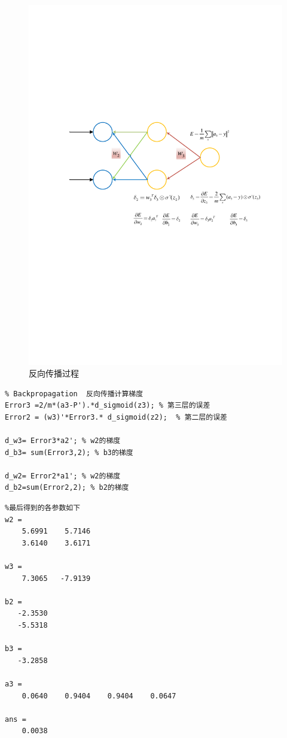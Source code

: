 \begin{figure}[H]
\centering
\includegraphics[width=13cm]{fig/Backpropagation.pdf}
\caption{反向传播过程}
\end{figure}

\begin{lstlisting}
% Backpropagation  反向传播计算梯度
Error3 =2/m*(a3-P').*d_sigmoid(z3); % 第三层的误差
Error2 = (w3)'*Error3.* d_sigmoid(z2);	% 第二层的误差

d_w3= Error3*a2'; % w2的梯度
d_b3= sum(Error3,2); % b3的梯度

d_w2= Error2*a1'; % w2的梯度
d_b2=sum(Error2,2); % b2的梯度
\end{lstlisting}


\begin{lstlisting}
%最后得到的各参数如下
w2 =
    5.6991    5.7146
    3.6140    3.6171

w3 =
    7.3065   -7.9139

b2 =
   -2.3530
   -5.5318

b3 =
   -3.2858

a3 =
    0.0640    0.9404    0.9404    0.0647

ans =
    0.0038
\end{lstlisting}

